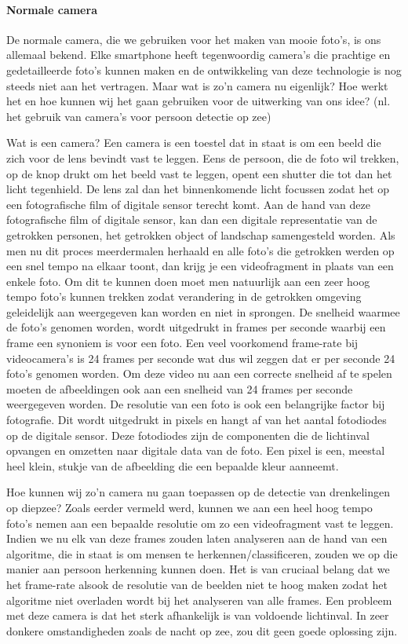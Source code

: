 \paragraph{Normale camera}

De normale camera, die we gebruiken voor het maken van mooie foto's, is ons allemaal bekend. Elke smartphone heeft tegenwoordig camera's die prachtige en gedetailleerde foto's kunnen maken en de ontwikkeling van deze technologie is nog steeds niet aan het vertragen. Maar wat is zo'n camera nu eigenlijk? Hoe werkt het en hoe kunnen wij het gaan gebruiken voor de uitwerking van ons idee? (nl. het gebruik van camera's voor persoon detectie op zee)

Wat is een camera? Een camera is een toestel dat in staat is om een beeld die zich voor de lens bevindt vast te leggen. Eens de persoon, die de foto wil trekken, op de knop drukt om het beeld vast te leggen, opent een shutter die tot dan het licht tegenhield. De lens zal dan het binnenkomende licht focussen zodat het op een fotografische film of digitale sensor terecht komt. Aan de hand van deze fotografische film of digitale sensor, kan dan een digitale representatie van de getrokken personen, het getrokken object of landschap samengesteld worden. Als men nu dit proces meerdermalen herhaald en alle foto's die getrokken werden op een snel tempo na elkaar toont, dan krijg je een videofragment in plaats van een enkele foto. Om dit te kunnen doen moet men natuurlijk aan een zeer hoog tempo foto's kunnen trekken zodat verandering in de getrokken omgeving geleidelijk aan weergegeven kan worden en niet in sprongen. De snelheid waarmee de foto's genomen worden, wordt uitgedrukt in frames per seconde waarbij een frame een synoniem is voor een foto. Een veel voorkomend frame-rate bij videocamera's is 24 frames per seconde wat dus wil zeggen dat er per seconde 24 foto's genomen worden. Om deze video nu aan een correcte snelheid af te spelen moeten de afbeeldingen ook aan een snelheid van 24 frames per seconde weergegeven worden. De resolutie van een foto is ook een belangrijke factor bij fotografie. Dit wordt uitgedrukt in pixels en hangt af van het aantal fotodiodes op de digitale sensor. Deze fotodiodes zijn de componenten die de lichtinval opvangen en omzetten naar digitale data van de foto. Een pixel is een, meestal heel klein, stukje van de afbeelding die een bepaalde kleur aanneemt. \autocite{DigitalCameras}


Hoe kunnen wij zo'n camera nu gaan toepassen op de detectie van drenkelingen op diepzee? Zoals eerder vermeld werd, kunnen we aan een heel hoog tempo foto's nemen aan een bepaalde resolutie om zo een videofragment vast te leggen. Indien we nu elk van deze frames zouden laten analyseren aan de hand van een algoritme, die in staat is om mensen te herkennen/classificeren, zouden we op die manier aan persoon herkenning kunnen doen. Het is van cruciaal belang dat we het frame-rate alsook de resolutie van de beelden niet te hoog maken zodat het algoritme niet overladen wordt bij het analyseren van alle frames. Een probleem met deze camera is dat het sterk afhankelijk is van voldoende lichtinval. In zeer donkere omstandigheden zoals de nacht op zee, zou dit geen goede oplossing zijn. 

